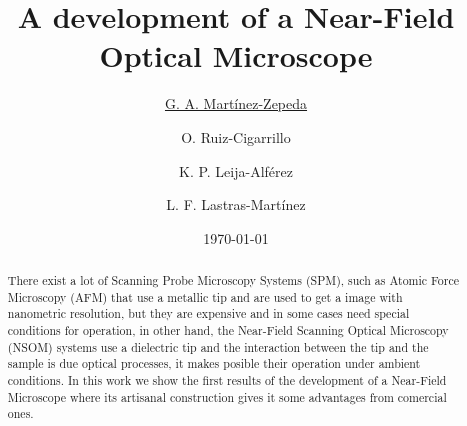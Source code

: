 \documentclass[reprint,aps,prb,citeautoscript,altaffilletter]{revtex4-2}
\begin{document}
	
	
	\title{ A development of a Near-Field Optical Microscope }
	\author{\underline{G. A. Mart\'inez-Zepeda}}
	\author{O. Ruiz-Cigarrillo}
	\author{{K. P. Leija-Alf\'erez}}
	\author{L. F. Lastras-Mart\'inez}
	
	\date{\today}
	
	\begin{abstract}
		There exist a lot of Scanning Probe Microscopy Systems (SPM), such as Atomic Force Microscopy (AFM) that use a metallic tip and are used to get a image with nanometric resolution, but they are expensive  and in some cases need special conditions for operation, in other hand, the Near-Field Scanning Optical Microscopy (NSOM) systems use a dielectric tip
		and the interaction between the tip and the sample is due optical processes, it makes posible their operation under ambient conditions. In this work we show the first results of the development  of a Near-Field Microscope where its artisanal construction gives it some advantages from comercial ones.
		
	\end{abstract}
	
	\maketitle
\end{document}
